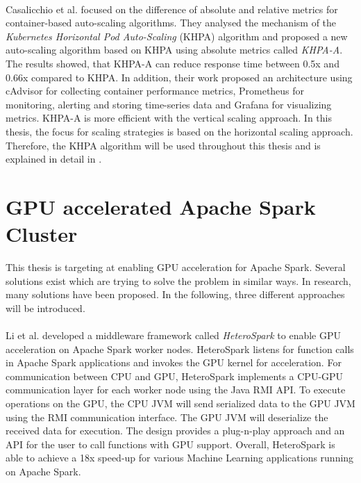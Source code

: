 \paragraph{}Casalicchio et al. \cite{Casalicchio2017AutoScaleCont} focused on the difference of absolute and relative metrics for container-based auto-scaling algorithms. They analysed the mechanism of the \textit{Kubernetes Horizontal Pod Auto-Scaling} (KHPA) algorithm and proposed a new auto-scaling algorithm based on KHPA using absolute metrics called \textit{KHPA-A}. The results showed, that KHPA-A can reduce response time between 0.5x and 0.66x compared to KHPA. In addition, their work proposed an architecture using cAdvisor for collecting container performance metrics, Prometheus for monitoring, alerting and storing time-series data and Grafana for visualizing metrics.
KHPA-A is more efficient with the vertical scaling approach. In this thesis, the focus for scaling strategies is based on the horizontal scaling approach. Therefore, the KHPA algorithm will be used throughout this thesis and is explained in detail in .


\section{GPU accelerated Apache Spark Cluster}
This thesis is targeting at enabling GPU acceleration for Apache Spark.
Several solutions exist which are trying to solve the problem in similar ways.
In research, many solutions have been proposed.
In the following, three different approaches will be introduced.


\paragraph{}
Li et al. \cite{Li2015HeteroSpark} developed a middleware framework called \textit{HeteroSpark} to enable GPU acceleration on Apache Spark worker nodes. HeteroSpark listens for function calls in Apache Spark applications and invokes the GPU kernel for acceleration. For communication between CPU and GPU, HeteroSpark implements a CPU-GPU communication layer for each worker node using the Java RMI API. To execute operations on the GPU, the CPU JVM will send serialized data to the GPU JVM using the RMI communication interface. The GPU JVM will deserialize the received data for execution.
The design provides a plug-n-play approach and an API for the user to call functions with GPU support.
Overall, HeteroSpark is able to achieve a 18x speed-up for various Machine Learning applications running on Apache Spark.


